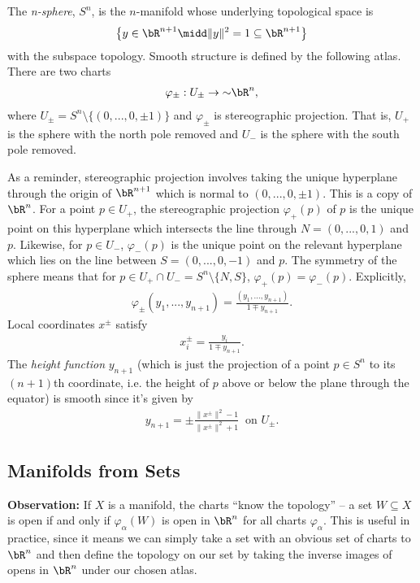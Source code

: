 \begin{example}\label{expl:n-sphere}
	The \emph{n-sphere}, $S^n$, is the $n$-manifold whose underlying topological space is
	\begin{align*}
		\left\{y \in \bR^{n+1} \midd \|y\|^2 = 1 \subseteq \bR^{n+1}\right\}
	\end{align*}
	with the subspace topology. Smooth structure is defined by the following atlas. There are two charts 
	\begin{align*}
		\varphi_{\pm}:U_{\pm} \to{\sim} \bR^n,
	\end{align*}
	where $U_{\pm} = S^n \setminus \{(0,...,0,\pm 1)\}$ and $\varphi_{\pm}$ is stereographic projection. That is, $U_+$ is the sphere with the north pole removed and $U_-$ is the sphere with the south pole removed.

    As a reminder, stereographic projection involves taking the unique hyperplane through the origin of $\bR^{n+1}$ which is normal to $(0,...,0,\pm 1)$. This is a copy of $\bR^n$. For a point $p \in U_+$, the stereographic projection $\varphi_+(p)$ of $p$ is the unique point on this hyperplane which intersects the line through $N = (0,...,0,1)$ and $p$. Likewise, for $p \in U_-$, $\varphi_-(p)$ is the unique point on the relevant hyperplane which lies on the line between $S = (0,...,0,-1)$ and $p$. The symmetry of the sphere means that for $p \in U_+ \cap U_- = S^n \setminus \{N,S\}$, $\varphi_+(p) = \varphi_-(p)$. Explicitly,
    \begin{align*}
    	\varphi_\pm(y_1,...,y_{n+1}) = \frac{(y_1,...,y_{n+1})}{1 \mp y_{n+1}}.
    \end{align*}
    Local coordinates $x^\pm$ satisfy
    \begin{align*}
	    x_i^\pm = \frac{y_i}{1 \mp y_{n+1}}.
    \end{align*}
    The \emph{height function} $y_{n+1}$ (which is just the projection of a point $p \in S^{n}$ to its $(n+1)$th coordinate, i.e. the height of $p$ above or below the plane through the equator) is smooth since it's given by
	\begin{align*}
		y_{n+1} = \pm \frac{\|x^\pm\|^2 - 1}{\|x^\pm\|^2 + 1} ~ \text{ on } U_\pm.
	\end{align*}
\end{example}

\subsection{Manifolds from Sets}
\textbf{Observation:} If $X$ is a manifold, the charts ``know the topology'' -- a set $W \subseteq X$ is open if and only if $\varphi_\alpha(W)$ is open in $\bR^n$ for all charts $\varphi_\alpha$. This is useful in practice, since it means we can simply take a set with an obvious set of charts to $\bR^n$ and then define the topology on our set by taking the inverse images of opens in $\bR^n$ under our chosen atlas.

